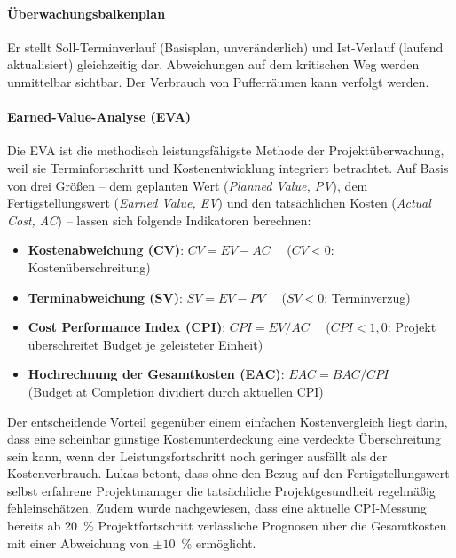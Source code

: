 \documentclass[
    a4paper,
    11pt,
    bibliography=totoc,
    listof=totoc,
    parskip=half,
    headings=normal
]{scrbook}
\begin{document}
\paragraph{Überwachungsbalkenplan}
Er stellt Soll-Terminverlauf (Basisplan, unveränderlich) und Ist-Verlauf
(laufend aktualisiert) gleichzeitig dar. Abweichungen auf dem kritischen Weg
werden unmittelbar sichtbar. Der Verbrauch von Pufferräumen kann verfolgt werden.

\paragraph{Earned-Value-Analyse (EVA)}
Die EVA ist die methodisch leistungsfähigste Methode der Projektüberwachung,
weil sie Terminfortschritt und Kostenentwicklung integriert betrachtet. Auf Basis
von drei Größen -- dem geplanten Wert (\textit{Planned Value, PV}), dem
Fertigstellungswert (\textit{Earned Value, EV}) und den tatsächlichen Kosten
(\textit{Actual Cost, AC}) -- lassen sich folgende Indikatoren berechnen\autocite[vgl.][S.~4\,ff.]{FlemingKoppelman2010}:

\begin{itemize}[noitemsep]
      \item \textbf{Kostenabweichung (CV)}: $CV = EV - AC$ \ \
            ($CV < 0$: Kostenüberschreitung)
      \item \textbf{Terminabweichung (SV)}: $SV = EV - PV$ \ \
            ($SV < 0$: Terminverzug)
      \item \textbf{Cost Performance Index (CPI)}: $CPI = EV / AC$ \ \
            ($CPI < 1{,}0$: Projekt überschreitet Budget je geleisteter Einheit)
      \item \textbf{Hochrechnung der Gesamtkosten (EAC)}: $EAC = BAC / CPI$ \\
            (Budget at Completion dividiert durch aktuellen CPI)
\end{itemize}

Der entscheidende Vorteil gegenüber einem einfachen Kostenvergleich liegt darin,
dass eine scheinbar günstige Kostenunterdeckung eine verdeckte Überschreitung
sein kann, wenn der Leistungsfortschritt noch geringer ausfällt als der
Kostenverbrauch. Lukas\autocite{Lukas2012} betont, dass ohne den Bezug auf den
Fertigstellungswert selbst erfahrene Projektmanager die tatsächliche
Projektgesundheit regelmäßig fehleinschätzen. Zudem wurde nachgewiesen, dass eine
aktuelle CPI-Messung bereits ab 20~\% Projektfortschritt verlässliche Prognosen
über die Gesamtkosten mit einer Abweichung von $\pm10$~\% ermöglicht\autocite[vgl.][]{FlemingKoppelman2010}.
\end{document}
